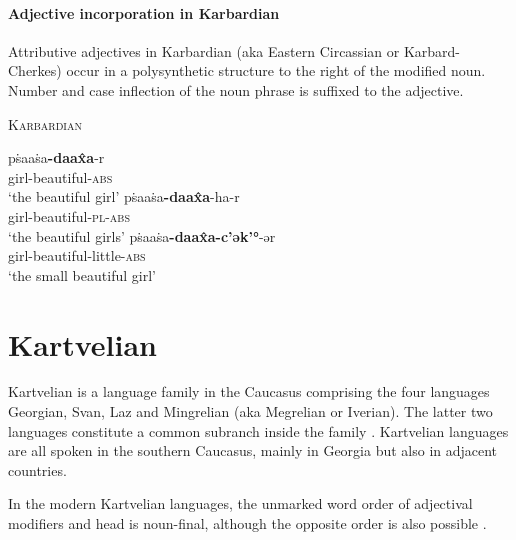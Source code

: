 \paragraph{Adjective incorporation in Karbardian}
Attributive adjectives in Karbardian (aka Eastern Circassian or Karbard-Cherkes) occur in a polysynthetic structure to the right of the modified noun. Number and case inflection of the noun phrase is suffixed to the adjective.
\begin{exe}
\ex \textsc{Karbardian} \citep[295]{colarusso1989}
\begin{xlist}
\ex	
\gll	pṡaaṡa\textbf{-daax̂a}-r\\
	girl-beautiful-\textsc{abs}\\
\glt	‘the beautiful girl’
\ex
\gll	pṡaaṡa\textbf{-daax̂a}-ha-r\\
	girl-beautiful-\textsc{pl}-\textsc{abs}\\
\glt	‘the beautiful girls’
\ex
\gll	pṡaaṡa\textbf{-daax̂a-c'ək'°}-ər\\
	girl-beautiful-little-\textsc{abs}\\
\glt	‘the small beautiful girl’
\end{xlist}
\end{exe}

\section{Kartvelian}\label{kartvelian synchr}
Kartvelian is a language family in the Caucasus comprising the four languages Georgian, Svan, Laz and Mingrelian (aka Megrelian or Iverian). The latter two languages constitute a common subranch inside the family \cite[220]{salminen2007}. Kartvelian languages are all spoken in the southern Caucasus, mainly in Georgia but also in adjacent countries.

In the modern Kartvelian languages, the unmarked word order of adjectival modifiers and head is noun-final, although the opposite order is also possible \citep[56]{harris1991a}.

